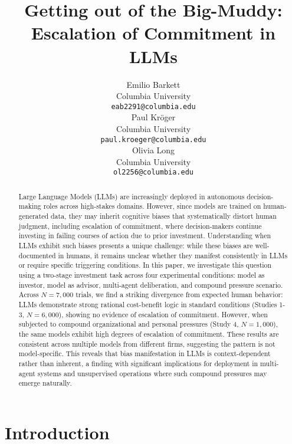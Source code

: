 \documentclass{article}
\title{Getting out of the Big-Muddy: Escalation of Commitment in LLMs}
\author{%
  Emilio Barkett \\
  Columbia University\\
  \texttt{eab2291@columbia.edu} \\
   \And
   Paul Kröger \\
   Columbia University \\
   \texttt{paul.kroeger@columbia.edu} \\
   \And
   Olivia Long \\
   Columbia University \\
   \texttt{ol2256@columbia.edu} \\
}
\begin{document}
\maketitle


\begin{abstract}

  Large Language Models (LLMs) are increasingly deployed in autonomous decision-making roles across high-stakes domains. However, since models are trained on human-generated data, they may inherit cognitive biases that systematically distort human judgment, including escalation of commitment, where decision-makers continue investing in failing courses of action due to prior investment. Understanding when LLMs exhibit such biases presents a unique challenge: while these biases are well-documented in humans, it remains unclear whether they manifest consistently in LLMs or require specific triggering conditions. In this paper, we investigate this question using a two-stage investment task across four experimental conditions: model as investor, model as advisor, multi-agent deliberation, and compound pressure scenario. Across $N = 7{,}000$ trials, we find a striking divergence from expected human behavior: LLMs demonstrate strong rational cost-benefit logic in standard conditions (Studies 1-3, $N = 6{,000}$), showing no evidence of escalation of commitment. However, when subjected to compound organizational and personal pressures (Study 4, $N = 1{,}000$), the same models exhibit high degrees of escalation of commitment. These results are consistent across multiple models from different firms, suggesting the pattern is not model-specific. This reveals that bias manifestation in LLMs is context-dependent rather than inherent, a finding with significant implications for deployment in multi-agent systems and unsupervised operations where such compound pressures may emerge naturally.
  
\end{abstract}

\section{Introduction}
\end{document}
